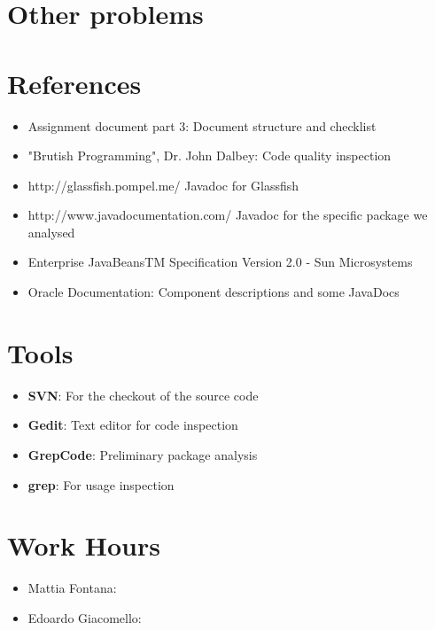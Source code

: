 \documentclass[11pt, a4paper,titlepage]{article}
\begin{document}
\section{Other problems}
\section{References}
	\begin{itemize}
		\item Assignment document part 3: Document structure and checklist
		\item "Brutish Programming", Dr. John Dalbey: Code quality inspection
		\item http://glassfish.pompel.me/ Javadoc for Glassfish
		\item http://www.javadocumentation.com/ Javadoc for the specific package we analysed
		\item Enterprise JavaBeansTM Specification Version 2.0 - Sun Microsystems 
		\item Oracle Documentation: Component descriptions and some JavaDocs
		
	\end{itemize}
\section{Tools}
	\begin{itemize}
		\item \textbf{SVN}: For the checkout of the source code
		\item \textbf{Gedit}: Text editor for code inspection
		\item \textbf{GrepCode}: Preliminary package analysis
		\item \textbf{grep}: For usage inspection
	\end{itemize}
\section{Work Hours}
	\begin{itemize}
		\item Mattia Fontana:
		\item Edoardo Giacomello: 
	\end{itemize}
\end{document}
